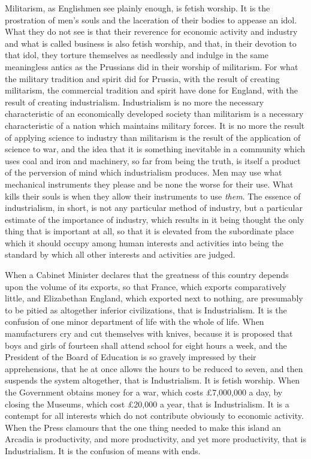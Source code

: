 \documentclass{book}
\begin{document}
Militarism, as Englishmen see plainly enough, is fetish worship. It is the prostration of men’s souls and the laceration of their bodies to appease an idol. What they do not see is that their reverence for economic activity and industry and what is called business is also fetish worship, and that, in their devotion to that idol, they torture themselves as needlessly and indulge in the same meaningless antics as the Prussians did in their worship of militarism. For what the military tradition and spirit did for Prussia, with the result of creating militarism, the commercial tradition and spirit have done for England, with the result of creating industrialism. Industrialism is no more the necessary characteristic of an economically developed society than militarism is a necessary characteristic of a nation which maintains military forces. It is no more the result of applying science to industry than militarism is the result of the application of science to war, and the idea that it is something inevitable in a community which uses coal and iron and machinery, so far from being the truth, is itself a product of the perversion of mind which industrialism produces. Men may use what mechanical instruments they please and be none the worse for their use. What kills their souls is when they allow their instruments to use \emph{them}. The essence of industrialism, in short, is not any particular method of industry, but a particular estimate of the importance of industry, which results in it being thought the only thing that is important at all, so that it is elevated from the subordinate place which it should occupy among human interests and activities into being the standard by which all other interests and activities are judged.

When a Cabinet Minister declares that the greatness of this country depends upon the volume of its exports, so that France, which exports comparatively little, and Elizabethan England, which exported next to nothing, are presumably to be pitied as altogether inferior civilizations, that is Industrialism. It is the confusion of one minor department of life with the whole of life. When manufacturers cry and cut themselves with knives, because it is proposed that boys and girls of fourteen shall attend school for eight hours a week, and the President of the Board of Education is so gravely impressed by their apprehensions, that he at once allows the hours to be reduced to seven, and then suspends the system altogether, that is Industrialism. It is fetish worship. When the Government obtains money for a war, which costs £7,000,000 a day, by closing the Museums, which cost £20,000 a year, that is Industrialism. It is a contempt for all interests which do not contribute obviously to economic activity. When the Press clamours that the one thing needed to make this island an Arcadia is productivity, and more productivity, and yet more productivity, that is Industrialism. It is the confusion of means with ends.
\end{document}

